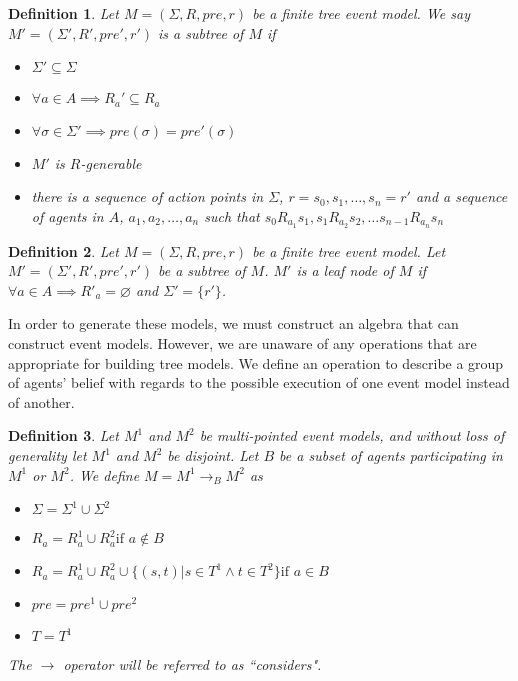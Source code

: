 \documentclass[12pt, a4paper, titlepage]{scrartcl}
\newtheorem{defn}{Definition}[section]
\numberwithin{equation}{section}
\begin{document}
\begin{defn} \label{subtree}
Let $M = (\Sigma, R, pre, r)$ be a finite tree event model.
We say $M' = (\Sigma', R', pre', r')$ is a subtree of $M$ if
\begin{itemize}
	\item $\Sigma' \subseteq \Sigma$
	\item $\forall a \in A \implies R_a' \subseteq R_a$
	\item $\forall \sigma \in \Sigma' \implies pre(\sigma) = pre'(\sigma) $
	\item $M'$ is $R$-generable
	\item there is a sequence of action points in $\Sigma$, $r = s_0, s_1, \ldots, s_n = r'$ and a
	sequence of agents in $A$, $a_1, a_2, \ldots, a_n$ such that $s_0 R_{a_1} s_1, s_1 R_{a_2} s_2,
	\ldots s_{n-1} R_{a_n} s_n$
\end{itemize}
\end{defn}

\begin{defn} \label{leaf}
Let $M = (\Sigma, R, pre, r)$ be a finite tree event model.
Let $M' = (\Sigma', R', pre', r')$ be a subtree of $M$.
$M'$ is a leaf node of $M$ if $\forall a \in A \implies R'_a = \varnothing$ and $\Sigma' = \{ r'\}$.
\end{defn}

In order to generate these models, we must construct an algebra that can construct event models.
However, we are unaware of any operations that are appropriate for building tree models.
We define an operation to describe a group of agents' belief with regards to the possible execution
of one event model instead of another.

\begin{defn} \label{considers}
Let $M^1$ and $M^2$ be multi-pointed event models, and without loss of
generality let $M^1$ and $M^2$ be disjoint.
Let $B$ be a subset of agents participating in $M^1$ or $M^2$.
We define $M = M^1 \to_B M^2$ as 
\begin{itemize}
  \item $\Sigma = \Sigma^1 \cup \Sigma^2$
  \item $R_a = R^1_a \cup R^2_a \text{if } a \notin B$
	\item $R_a =
      R^1_a \cup
      R^2_a \cup
      \{(s,t) | s \in T^1 \land t \in T^2 \}
    \text{if } a \in B $
  \item $pre = pre^1 \cup pre^2$
  \item $T = T^1$
\end{itemize}
The $\to$ operator will be referred to as ``considers".
\end{defn}
\end{document}
